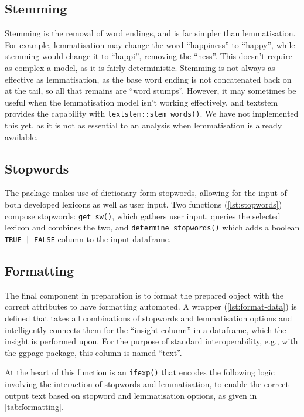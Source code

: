 \documentclass[11pt, a4paper, twoside, titlepage]{report}
\begin{document}
\subsection{Stemming}

Stemming is the removal of word endings, and is far simpler than
lemmatisation. For example, lemmatisation may change the word
``happiness'' to ``happy'', while stemming would change it to
``happi'', removing the ``ness''. This doesn't require as complex a
model, as it is fairly deterministic. Stemming is not always as
effective as lemmatisation, as the base word ending is not
concatenated back on at the tail, so all that remains are ``word
stumps''. However, it may sometimes be useful when the lemmatisation
model isn't working effectively, and textstem provides the capability
with \texttt{textstem::stem_words()}. We have not implemented
this yet, as it is not as essential to an analysis when lemmatisation
is already available.

\subsection{Stopwords}\label{sec:stopwords}

The package makes use of dictionary-form stopwords, allowing for the
input of both developed lexicons as well as user input. Two functions
(\cref{lst:stopwords}) compose stopwords:
\texttt{get_sw()}, which gathers user input, queries the
selected lexicon and combines the two, and
\texttt{determine_stopwords()} which adds a boolean
\texttt{TRUE | FALSE} column to the input dataframe.

\subsection{Formatting}\label{sec:formatting}

The final component in preparation is to format the prepared object
with the correct attributes to have formatting automated. A wrapper
(\cref{lst:format-data}) is defined that takes all combinations
of stopwords and lemmatisation options and intelligently connects them
for the ``insight column'' in a dataframe, which the insight is
performed upon. For the purpose of standard interoperability, e.g.,
with the ggpage package, this column is named ``text''.

At the heart of this function is an \texttt{ifexp()} that
encodes the following logic involving the interaction of stopwords and
lemmatisation, to enable the correct output text based on stopword and
lemmatisation options, as given in \cref{tab:formatting}.
\end{document}
